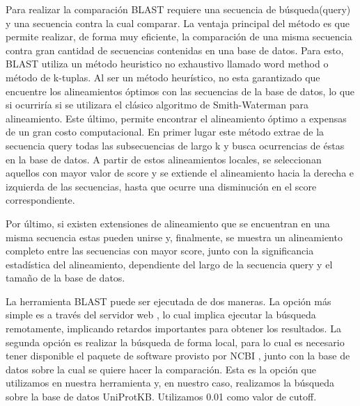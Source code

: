 Para realizar la comparación BLAST requiere una secuencia de búsqueda(query) y una secuencia contra la cual comparar.
La ventaja principal del método es que permite realizar, de forma muy eficiente, la comparación de una misma secuencia contra gran cantidad de secuencias contenidas en una base de datos.
Para esto, BLAST utiliza un método heuristico no exhaustivo llamado word method o método de k-tuplas.
Al ser un método heurístico, no esta garantizado que encuentre los alineamientos óptimos con las secuencias de la base de datos, lo que si ocurriría si se utilizara el clásico algoritmo de Smith-Waterman para alineamiento.
Este último, permite encontrar el alineamiento óptimo a expensas de un gran costo computacional.
En primer lugar este método extrae de la secuencia query todas las subsecuencias de largo k y busca ocurrencias de éstas en la base de datos.
A partir de estos alineamientos locales, se seleccionan aquellos con mayor valor de score y se extiende el alineamiento hacia la derecha e izquierda de las secuencias, 
hasta que ocurre una disminución en el score correspondiente.

Por último, si existen extensiones de alineamiento que se encuentran en una misma secuencia estas pueden unirse y, finalmente, se muestra un alineamiento completo entre las secuencias con mayor score, junto con 
la significancia estadística del alineamiento, dependiente del largo de la secuencia query y el tamaño de la base de datos.






La herramienta BLAST puede ser ejecutada de dos maneras. La opción más simple es a través del servidor web \cite{blastWeb}, lo cual implica ejecutar la búsqueda remotamente, implicando retardos importantes para obtener los resultados. 
La segunda opción es realizar la búsqueda de forma local, para lo cual es necesario tener disponible el paquete de software provisto por NCBI \cite{blastLocal}, junto con la base de datos sobre la cual se quiere hacer la comparación.
Esta es la opción que utilizamos en nuestra herramienta y, en nuestro caso, realizamos la búsqueda sobre la base de datos UniProtKB\cite{bairoch2000swiss}.
Utilizamos 0.01 como valor de cutoff.

